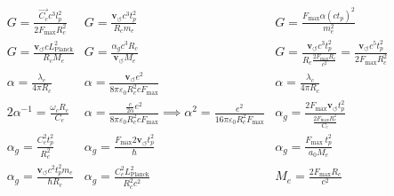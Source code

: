     \begin{equation*}
    \begin{array}{ccc}
            G = \frac{\vec{C_e} c^3 l_p^2}{2 F_{\max } R_c^2} & G = \frac{\mathbf{v}_{\scriptscriptstyle\boldsymbol{\circlearrowleft}} c^3 t_p^2}{R_c m_e} & G = \frac{F_{\operatorname{max}} \alpha (c t_p)^2}{m_e^2} \\
            G = \frac{\mathbf{v}_{\scriptscriptstyle\boldsymbol{\circlearrowleft}} c L_\text{Planck}^2}{R_c M_e} & G = \frac{\alpha_g c^3 R_c}{\mathbf{v}_{\scriptscriptstyle\boldsymbol{\circlearrowleft}} M_e} & G = \frac{\mathbf{v}_{\scriptscriptstyle\boldsymbol{\circlearrowleft}} c^3 t_p^2}{R_c \frac{2 F_{\max} R_c}{c^2}} = \frac{\mathbf{v}_{\scriptscriptstyle\boldsymbol{\circlearrowleft}} c^5 t_p^2}{2 F_{\max} R_c^2} \\
            \alpha = \frac{\lambda_e}{4 \pi R_c} & \alpha = \frac{\mathbf{v}_{\scriptscriptstyle\boldsymbol{\circlearrowleft}} e^2}{8 \pi \varepsilon_0 R_c^2 c F_{\max}} & \alpha = \frac{\lambda_c}{4 \pi R_c} \\
            2\alpha^{-1} = \frac{\omega_c R_c}{C_e} & \alpha = \frac{\frac{c}{2 \alpha} e^2}{8 \pi \varepsilon_0 R_c^2 c F_{\max}} \implies \alpha^2 = \frac{e^2}{16 \pi \varepsilon_0 R_c^2 F_{\max}} & \alpha_g = \frac{2F_{\max} \mathbf{v}_{\scriptscriptstyle\boldsymbol{\circlearrowleft}} t_p^2}{\frac{2F_{\max} R_c^2}{C_e}} \\
            \alpha_g = \frac{C_e^2 t_p^2}{R_c^2} & \alpha_g = \frac{F_{\max} 2 \mathbf{v}_{\scriptscriptstyle\boldsymbol{\circlearrowleft}} t_p^2}{\hbar} & \alpha_g = \frac{F_{\text {max }} t_p^2}{a_0 M_e} \\
            \alpha_g = \frac{\mathbf{v}_{\scriptscriptstyle\boldsymbol{\circlearrowleft}} c^2 t_p^2 m_e}{\hbar R_c} & \alpha_g = \frac{C_e^2 L_\text{Planck}^2}{R_c^2 c^2} & M_e = \frac{2 F_{\max} R_c}{c^2} \\
        \end{array}
    \end{equation*}

